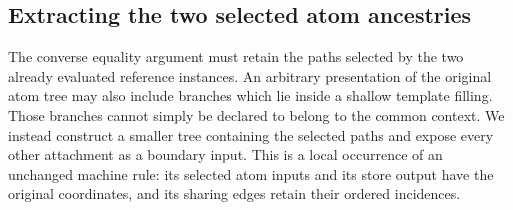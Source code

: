 \subsection{Extracting the two selected atom ancestries}
The converse equality argument must retain the paths selected by the two
already evaluated reference instances. An arbitrary presentation of the original
atom tree may also include branches which lie inside a shallow template filling.
Those branches cannot simply be declared to belong to the common context. We
instead construct a smaller tree containing the selected paths and expose every
other attachment as a boundary input. This is a local occurrence of an unchanged
machine rule: its selected atom inputs and its store output have the original
coordinates, and its sharing edges retain their ordered incidences.

